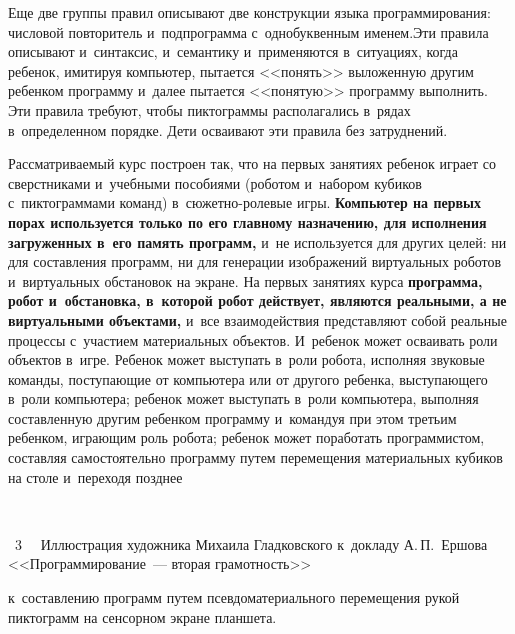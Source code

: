 \begin{multicols}{2}
  Еще две группы правил описывают две конст\-рукции языка 
программирования: числовой повторитель и~подпрограмма с~однобуквенным 
именем.\linebreak Эти правила описывают и~синтаксис, и~семантику и~применяются 
в~ситуациях, когда ребенок, имитируя компьютер, пытается <<понять>> 
выложенную другим ребенком программу и~далее пытается <<понятую>> 
программу выполнить. Эти правила требуют, чтобы пиктограммы 
располагались в~рядах в~определенном порядке. Дети осваивают эти правила 
без затруднений.
  
  Рассматриваемый курс построен так, что на первых занятиях ребенок играет 
со сверстниками и~учебными пособиями (роботом и~набором кубиков 
с~пиктограммами команд) в~сюжетно-ролевые игры. \textbf{Компьютер на 
первых порах используется только по его главному назначению, для 
исполнения загруженных в~его память программ,} и~не используется для 
других целей: ни для составления программ, ни для генерации изображений 
виртуальных роботов и~виртуальных обстановок на экране. На первых занятиях 
курса \textbf{программа, робот и~обстановка, в~которой робот действует, 
являются реальными, а не виртуальными объектами,} и~все 
взаимодействия представляют собой реальные процессы с~участием 
материальных объектов. И~ребенок может осваивать роли объектов в~игре. 
Ребенок может выступать в~роли робота, исполняя звуковые команды, 
поступающие от компьютера или от другого ребенка, выступающего в~роли 
компьютера; ребенок может выступать в~роли компьютера, выполняя 
составленную другим ребенком программу и~командуя при этом третьим 
ребенком, играющим роль робота; ребенок может поработать программистом, 
составляя самостоятельно программу путем перемещения материальных 
кубиков на столе и~переходя позднее\linebreak\vspace*{-12pt}

{ \begin{center}  %
 \vspace*{-1pt}
    \mbox{%
 \epsfxsize=79mm 
 }

\end{center}

\noindent
{{\figurename~3}\ \ \small{
Иллюстрация художника Михаила Гладковского к~докладу А.\,П.~Ершова 
<<Программирование~--- вторая грамотность>>
}}}

\vspace*{9pt}




\noindent
 к~составлению программ путем 
псевдоматериального перемещения рукой пиктограмм на сенсорном экране 
планшета.
  

\end{multicols}

